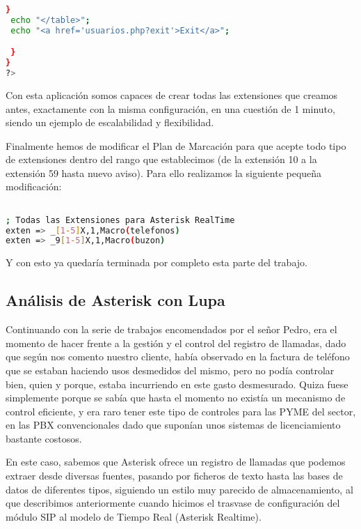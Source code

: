 {\begin{lstlisting}[language=bash,title={./www/usuarios.php}]
 }
 echo "</table>";
 echo "<a href='usuarios.php?exit'>Exit</a>";

 }
}
?>

\end{lstlisting}

Con esta aplicación somos capaces de crear todas las extensiones que creamos antes, exactamente con la misma configuración, en una cuestión de 1 minuto, siendo un ejemplo de escalabilidad y flexibilidad.

Finalmente hemos de modificar el Plan de Marcación para que acepte todo tipo de extensiones dentro del rango que establecimos (de la extensión 10 a la extensión 59 hasta nuevo aviso). Para ello realizamos la siguiente pequeña modificación:

\begin{lstlisting}[language=bash,title={/etc/asterisk/extensions.conf}]

; Todas las Extensiones para Asterisk RealTime
exten => _[1-5]X,1,Macro(telefonos)
exten => _9[1-5]X,1,Macro(buzon)

\end{lstlisting}

Y con esto ya quedaría terminada por completo esta parte del trabajo.

\subsection{Análisis de Asterisk con Lupa}

Continuando con la serie de trabajos encomendados por el señor Pedro, era el momento de hacer frente a la gestión y el control del registro de llamadas, dado que según nos comento nuestro cliente, había observado en la factura de teléfono que se estaban haciendo usos desmedidos del mismo, pero no podía controlar bien, quien y porque, estaba incurriendo en este gasto desmesurado. Quiza fuese simplemente porque se sabía que hasta el momento no existía un mecanismo de control eficiente, y era raro tener este tipo de controles para las PYME del sector, en las PBX convencionales dado que suponían unos sistemas de licenciamiento bastante costosos.

En este caso, sabemos que Asterisk ofrece un registro de llamadas que podemos extraer desde diversas fuentes, pasando por ficheros de texto hasta las bases de datos de diferentes tipos, siguiendo un estilo muy parecido de almacenamiento, al que describimos anteriormente cuando hicimos el trasvase de configuración del módulo SIP al modelo de Tiempo Real (Asterisk Realtime).

}
